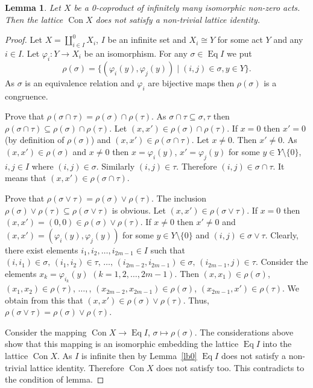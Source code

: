\documentclass{birkau}
\numberwithin{equation}{section}
\theoremstyle{plain}
\newtheorem{lemma}[theorem]{Lemma}
\theoremstyle{definition}
\DeclareMathOperator{\Con}{Con}
\DeclareMathOperator{\Eq}{Eq}
\begin{document}
	\begin{lemma} \label{lemma:456}
	    Let $X$ be a 0-coproduct of infinitely many isomorphic non-zero acts. Then the lattice $\Con X$ does not satisfy a non-trivial lattice identity.
	\end{lemma}
	\begin{proof}
	    Let $X=\coprod_{i\in I}^0X_i$, $I$ be an infinite set and $X_i\cong Y$ for some act $Y$ and any $i\in I$. Let $\varphi_i: Y\to X_i$ be an isomorphism. For any $\sigma \in \Eq I$ we put $$ \rho(\sigma)= \{ (\varphi_i(y), \varphi_j(y)) \mid (i,j)\in \sigma, y\in Y \}. $$ As $\sigma$ is an equivalence relation and $\varphi_i$ are bijective maps then $\rho(\sigma)$ is a congruence.

        Prove that $\rho(\sigma \cap \tau) = \rho(\sigma) \cap \rho(\tau)$. As $\sigma \cap \tau \subseteq \sigma, \tau$ then $\rho(\sigma \cap \tau) \subseteq \rho(\sigma) \cap \rho(\tau)$. Let $ (x, x') \in \rho(\sigma) \cap \rho(\tau)$. If $x=0$ then $x'=0$ (by definition of $\rho(\sigma)$) and $ (x, x') \in \rho(\sigma \cap \tau)$. Let $x \ne 0$. Then $x' \ne 0$. As $ (x, x') \in \rho(\sigma)$ and $x \ne 0$ then $x=\varphi_i(y)$, $x'=\varphi_j(y)$ for some $y\in Y \setminus \{0\}$, $i,j \in I$ where $(i, j) \in \sigma$. Similarly $(i, j) \in \tau$. Therefore $(i, j)\in \sigma \cap \tau$. It means that $(x, x') \in \rho(\sigma \cap \tau)$.

        Prove that $\rho(\sigma \vee \tau) = \rho(\sigma) \vee \rho(\tau)$.  The inclusion  $\rho(\sigma) \vee \rho(\tau) \subseteq \rho(\sigma \vee \tau)$ is obvious. Let $(x, x') \in \rho(\sigma \vee \tau)$. If $x=0$ then $(x, x') = (0,0) \in \rho(\sigma) \vee \rho(\tau)$. If $x \ne 0$ then $x' \ne 0$ and $(x, x') =(\varphi_i(y), \varphi_j(y))$ for some $y\in Y \setminus \{ 0\}$ and $(i, j) \in \sigma \vee \tau$. Clearly, there exist elements $i_1, i_2, \ldots, i_{2m-1} \in I$ such that $(i, i_1) \in \sigma, \,(i_1, i_2) \in \tau, \, \ldots, \, (i_{2m-2}, i_{2m-1}) \in \sigma, \, (i_{2m-1}, j) \in \tau$. Consider the elements $x_k=\varphi_{i_k}(y)$ $(k=1,2, \ldots, 2m-1)$. Then $(x, x_1) \in \rho(\sigma)$, $(x_1, x_2) \in \rho(\tau)$, $\ldots,$, $(x_{2m-2}, x_{2m-1}) \in \rho(\sigma)$, $(x_{2m-1}, x') \in \rho(\tau)$. We obtain from this that $(x, x') \in \rho(\sigma) \vee \rho(\tau)$. Thus, $\rho(\sigma \vee \tau) = \rho(\sigma) \vee \rho(\tau)$.

        Consider the mapping  $\Con X \to \Eq I$, $\sigma \mapsto \rho(\sigma)$. The considerations above show that this mapping is an isomorphic embedding the lattice $\Eq I$ into the lattice $\Con X$. As $I$ is infinite then by Lemma~\ref{lb0} $\Eq I$ does not satisfy a non-trivial lattice identity. Therefore $\Con X$ does not satisfy too. This contradicts to the condition of lemma.
	\end{proof}
	
\end{document}
